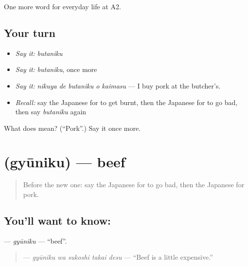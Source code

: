 \begin{grammarlens}[title={What you've built}]
One more word for everyday life at A2.
\end{grammarlens}

\subsection*{Your turn}
\begin{itemize}
\raggedright
  \item \emph{Say it:} \emph{butaniku}
  \item \emph{Say it:} \emph{butaniku}, once more
  \item \emph{Say it:} \emph{nikuya de butaniku o kaimasu} — I buy pork at the butcher's.
  \item \emph{Recall:} say the Japanese for to get burnt, then the Japanese for to go bad, then say \emph{butaniku} again
\end{itemize}

\begin{tcolorbox}[breakable,colback=teal!4,colframe=teal!35!black,title={Before you move on}]
What does  mean? (\textquotedblleft{}Pork\textquotedblright{}.) Say it once more.
\end{tcolorbox}
\section[\texorpdfstring{\ja{ぎゅうにく} (gyūniku)}{ぎゅうにく (gyūniku)}]{ (gyūniku) — beef}

\label{lesson:JA-C178-gyuuniku}



\begin{quote}
Before the new one: say the Japanese for to go bad, then the Japanese for pork.
\end{quote}

\subsection*{You'll want to know: }
\textbf{} — \emph{gyūniku} — \textquotedblleft{}beef\textquotedblright{}.

\begin{quote}
\textbf{  } — \emph{gyūniku wa sukoshi takai desu} — \textquotedblleft{}Beef is a little expensive.\textquotedblright{}
\end{quote}

